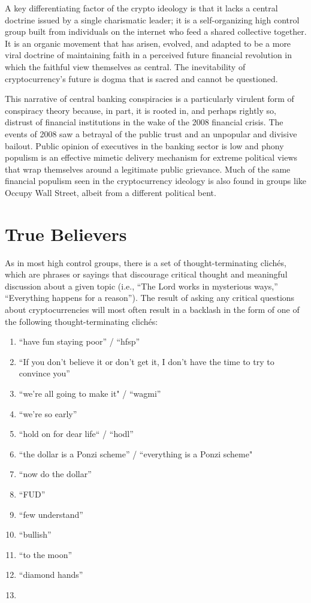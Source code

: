 A key differentiating factor of the crypto ideology is that it lacks a central
doctrine issued by a single charismatic leader; it is a self-organizing high
control group built from individuals on the internet who feed a shared
collective together. It is an organic movement that has arisen, evolved, and
adapted to be a more viral doctrine of maintaining faith
\cite{weisenthal_bitcoin_nodate} in a perceived future financial revolution in
which the faithful view themselves as central. The inevitability of
cryptocurrency's future is dogma that is sacred and cannot be questioned.


This narrative of central banking conspiracies is a particularly virulent form
of conspiracy theory because, in part, it is rooted in, and perhaps rightly so,
distrust of financial institutions in the wake of the 2008 financial crisis. The
events of 2008 saw a betrayal of the public trust and an unpopular and divisive
bailout. Public opinion of executives in the banking sector is low and phony
populism is an effective mimetic delivery mechanism for extreme political views
that wrap themselves around a legitimate public grievance.
\cite{varoufakis_yanis_2022} Much of the same financial populism seen in the
cryptocurrency ideology is also found in groups like Occupy Wall Street, albeit
from a different political bent.

\section{True Believers}

As in most high control groups, there is a set of thought-terminating clichés,
which are phrases or sayings that discourage critical thought and meaningful
discussion about a given topic \cite{montell_cultish_2021} (i.e., ``The Lord
works in mysterious ways,'' ``Everything happens for a reason''). The result of
asking any critical questions about cryptocurrencies will most often result in a
backlash in the form of one of the following thought-terminating clichés:

\begin{enumerate}
  \item ``have fun staying poor'' / ``hfsp''
  \item ``If you don't believe it or don't get it, I don't have the time to try to convince you''
  \item ``we're all going to make it" / ``wagmi''
  \item ``we're so early''
  \item ``hold on for dear life`` / ``hodl''
  \item ``the dollar is a Ponzi scheme'' / ``everything is a Ponzi scheme"
  \item ``now do the dollar''
  \item ``FUD''
  \item ``few understand''
  \item ``bullish''
  \item ``to the moon''
  \item ``diamond hands''
  \item {}
\end{enumerate}

